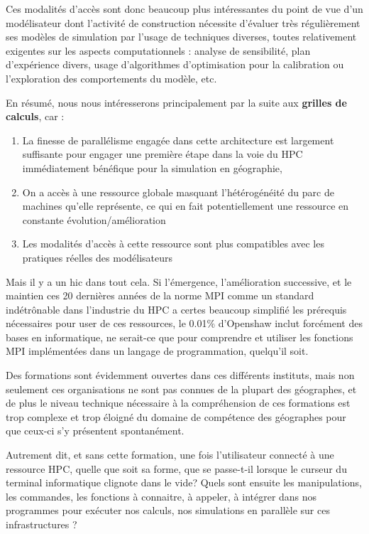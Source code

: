 Ces modalités d'accès sont donc beaucoup plus intéressantes du point de vue d'un modélisateur dont l'activité de construction nécessite d'évaluer très régulièrement ses modèles de simulation par l'usage de techniques diverses, toutes relativement exigentes sur les aspects computationnels : analyse de sensibilité, plan d'expérience divers, usage d'algorithmes d'optimisation pour la calibration ou l'exploration des comportements du modèle, etc.

En résumé, nous nous intéresserons principalement par la suite aux \textbf{grilles de calculs}, car :

\begin{enumerate}[label=(\alph*),labelindent=\parindent,leftmargin=*]
\item La finesse de parallélisme engagée dans cette architecture est largement suffisante pour engager une première étape dans la voie du HPC immédiatement bénéfique pour la simulation en géographie,
\item On a accès à une ressource globale masquant l'hétérogénéité du parc de machines qu'elle représente, ce qui en fait potentiellement une ressource en constante évolution/amélioration
\item Les modalités d'accès à cette ressource sont plus compatibles avec les pratiques réelles des modélisateurs
\end{enumerate}

Mais il y a un hic dans tout cela. Si l'émergence, l'amélioration successive, et le maintien ces 20 dernières années de la norme MPI comme un standard indétrônable dans l'industrie du HPC a certes beaucoup simplifié les prérequis nécessaires pour user de ces ressources, le 0.01\% d'Openshaw inclut forcément des bases en informatique, ne serait-ce que pour comprendre et utiliser les fonctions MPI implémentées dans un langage de programmation, quelqu'il soit.

Des formations sont évidemment ouvertes dans ces différents instituts, mais non seulement ces organisations ne sont pas connues de la plupart des géographes, et de plus le niveau technique nécessaire à la compréhension de ces formations est trop complexe et trop éloigné du domaine de compétence des géographes pour que ceux-ci s'y présentent spontanément.

Autrement dit, et sans cette formation, une fois l'utilisateur connecté à une ressource HPC, quelle que soit sa forme, que se passe-t-il lorsque le curseur du terminal informatique clignote dans le vide? Quels sont ensuite les manipulations, les commandes, les fonctions à connaitre, à appeler, à intégrer dans nos programmes pour exécuter nos calculs, nos simulations en parallèle sur ces infrastructures ?

